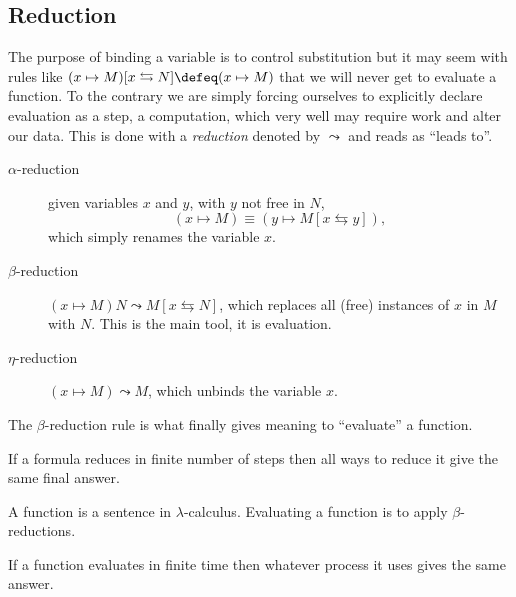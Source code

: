 \subsection{Reduction}
The purpose of binding a variable is to control substitution but it may seem 
with rules like $(x\mapsto M)[x\leftrightarrows N]\defeq (x\mapsto M)$ that 
we will never get to evaluate a function.  To the contrary we are simply forcing 
ourselves to explicitly declare evaluation as a step, a computation, which 
very well may require work and alter our data.  This is done with a \emph{reduction}
denoted by $\leadsto$ and reads as ``leads to''.\index{$\leadsto$}
\begin{description}
    \item[$\alpha$-reduction] given variables $x$ and $y$, with $y$ not free in $N$,
    \[(x\mapsto M)\equiv (y\mapsto M[x\leftrightarrows y]),\]
    which simply renames the variable $x$.

    \item[$\beta$-reduction]
    $(x\mapsto M)N\leadsto M[x\leftrightarrows N]$, which replaces all (free)
    instances of $x$ in $M$ with $N$.  This is the main tool, it is evaluation.
    
    \item[$\eta$-reduction]
    $(x\mapsto M)\leadsto M$, which unbinds the variable $x$.
\end{description}

The $\beta$-reduction rule is what finally gives meaning to ``evaluate'' a function.

\begin{theorem}
    If a formula reduces in finite number of steps then all ways to reduce it give the same 
    final answer.
\end{theorem}


\begin{definition}
    A function is a sentence in $\lambda$-calculus.
    Evaluating a function is to apply $\beta$-reductions.
\end{definition}

\begin{corollary}
    If a function evaluates in finite time then whatever process it uses 
    gives the same answer.
\end{corollary}

